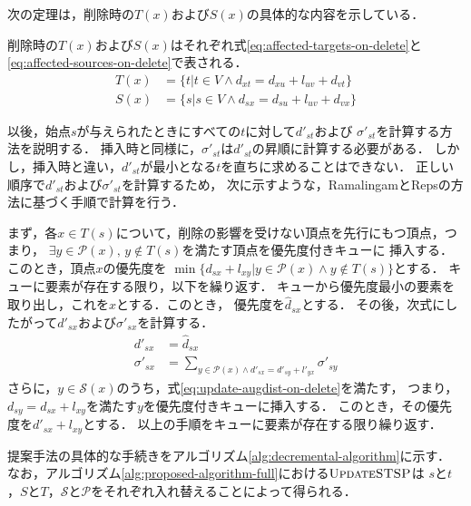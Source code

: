 次の定理は，削除時の$T(x)$および$S(x)$の具体的な内容を示している．
\begin{theorem}
  \label{thm:affected-vertices-on-delete}
  削除時の$T(x)$および$S(x)$はそれぞれ式\eqref{eq:affected-targets-on-delete}と
  \eqref{eq:affected-sources-on-delete}で表される．
  \begin{align}
    T(x)&=\{t|t\in V\land d_{xt}=d_{xu}+l_{uv}+d_{vt}\}
    \label{eq:affected-targets-on-delete} \\
    S(x)&=\{s|s\in V\land d_{sx}=d_{su}+l_{uv}+d_{vx}\}
    \label{eq:affected-sources-on-delete}
  \end{align}
\end{theorem}

以後，始点$s$が与えられたときにすべての$t$に対して$d'_{st}$および
$\sigma'_{st}$を計算する方法を説明する．
挿入時と同様に，$\sigma'_{st}$は$d'_{st}$の昇順に計算する必要がある．
しかし，挿入時と違い，$d'_{st}$が最小となる$t$を直ちに求めることはできない．
正しい順序で$d'_{st}$および$\sigma'_{st}$を計算するため，
次に示すような，RamalingamとRepsの方法に基づく手順で計算を行う．

まず，各$x\in T(s)$について，削除の影響を受けない頂点を先行にもつ頂点，つまり，
$\exists y\in\mathcal{P}(x),\,y\notin T(s)$を満たす頂点を優先度付きキューに
挿入する．このとき，頂点$x$の優先度を
$\min\{d_{sx}+l_{xy}|y\in\mathcal{P}(x)\land y\notin T(s)\}$とする．
キューに要素が存在する限り，以下を繰り返す．
キューから優先度最小の要素を取り出し，これを$x$とする．このとき，
優先度を$\hat{d}_{sx}$とする．
その後，次式にしたがって$d'_{sx}$および$\sigma'_{sx}$を計算する．
\begin{equation*}
  \begin{aligned}
    d'_{sx}&=\hat{d}_{sx} \\
    \sigma'_{sx}&=\sum_{y\in\mathcal{P}(x)\land d'_{sx}=d'_{sy}+l'_{yx}}\sigma'_{sy}
  \end{aligned}
\end{equation*}
さらに，$y\in\mathcal{S}(x)$のうち，式\eqref{eq:update-augdist-on-delete}を満たす，
つまり，$d_{sy}=d_{sx}+l_{xy}$を満たす$y$を優先度付きキューに挿入する．
このとき，その優先度を$d'_{sx}+l_{xy}$とする．
以上の手順をキューに要素が存在する限り繰り返す．

提案手法の具体的な手続きをアルゴリズム\ref{alg:decremental-algorithm}に示す．
なお，アルゴリズム\ref{alg:proposed-algorithm-full}における$\textproc{UpdateSTSP}$は
$s$と$t$，$S$と$T$，$\mathcal{S}$と$\mathcal{P}$をそれぞれ入れ替えることによって得られる．

